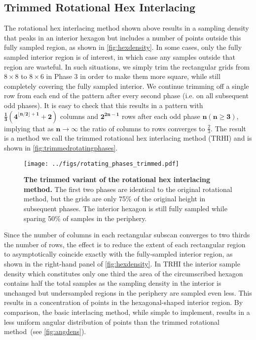 \documentclass[aip, amsmath, amssymb, nobibnotes, nofootinbib, citeautoscript, reprint, superscriptaddress]{revtex4-1}
\begin{document}
    \subsection{\label{ssec:trimmed}Trimmed Rotational Hex Interlacing}

    The rotational hex interlacing method shown above results in a sampling density that peaks in an interior hexagon but includes a number of points outside this fully sampled region, as shown in \autoref{fig:hexdensity}.
    In some cases, only the fully sampled interior region is of interest, in which case any samples outside that region are wasteful.
    In such situations, we simply trim the rectangular grids from $\mathrm{8\times 8}$ to $\mathrm{8\times 6}$ in
    Phase 3 in order to make them more square, while still completely covering the fully sampled interior.
    We continue trimming off a single row from each end of the pattern after every second phase (i.e. on all subsequent odd phases).
    It is easy to check that this results in a pattern with $\mathbf{\frac{1}{3}\left(4^{\lfloor n/2\rfloor + 1} + 2\right)}$ columns and $\mathbf{2^{2n - 1}}$ rows after each odd phase $\mathbf{n \left(n\ge 3\right)}$, implying that as $\mathbf{n\to\infty}$ the
    ratio of columns to rows converges to $\mathrm{\frac{2}{3}}$.
    The result is a method we call the trimmed rotational hex interlacing method (TRHI) and is shown in \autoref{fig:trimmedrotatingphases}.


    \begin{figure*}
        \centering
        \texttt{[image: ../figs/rotating\_phases\_trimmed.pdf]}
        \caption{
            \label{fig:trimmedrotatingphases} 
            \textbf{The trimmed variant of the rotational hex interlacing method.}
            The first two phases are identical to the original rotational method, but the grids are only 75\% of the original height in subsequent phases.
            The interior hexagon is still fully sampled while sparing 50\% of samples in the periphery.
            }
    \end{figure*}


    Since the number of columns in each rectangular subscan converges to two thirds the number of rows, the effect is to reduce the extent of each rectangular region to asymptotically coincide exactly with the fully-sampled interior region, as shown in the right-hand panel of \autoref{fig:hexdensity}.
    In TRHI the interior sample density which constitutes only one third the area of the circumscribed hexagon contains half the total samples as the sampling density in the interior is unchanged but undersampled regions in the periphery are sampled even less.
    This results in a concentration of points in the hexagonal-shaped interior region.
    By comparison, the basic interlacing method, while simple to implement, results in a less uniform angular distribution of points than the trimmed rotational method~(see \autoref{fig:angdens}).
\end{document}
